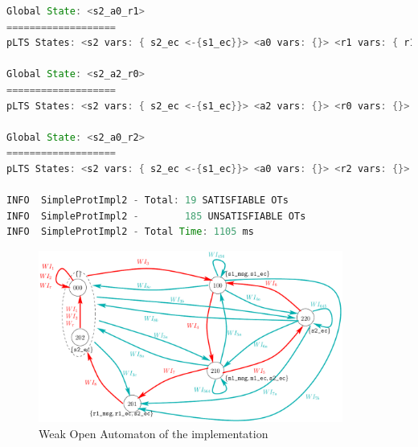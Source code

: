 \documentclass{lmcs}
\begin{document}
\begin{lstlisting}[basicstyle=\scriptsize\ttfamily, language=java, frame=single]
Global State: <s2_a0_r1>
===================
pLTS States: <s2 vars: { s2_ec <-{s1_ec}}> <a0 vars: {}> <r1 vars: { r1_ec <-{c} r1_msg <-{msg}}>

Global State: <s2_a2_r0>
===================
pLTS States: <s2 vars: { s2_ec <-{s1_ec}}> <a2 vars: {}> <r0 vars: {}>

Global State: <s2_a0_r2>
===================
pLTS States: <s2 vars: { s2_ec <-{s1_ec}}> <a0 vars: {}> <r2 vars: {}>

INFO  SimpleProtImpl2 - Total: 19 SATISFIABLE OTs
INFO  SimpleProtImpl2 -        185 UNSATISFIABLE OTs
INFO  SimpleProtImpl2 - Total Time: 1105 ms

\end{lstlisting}






\begin{figure}[h]
   \centerline{\includegraphics[width=10cm]{XFIG/SimpleProtImpl-WOA2}}
   \caption{Weak Open Automaton of the implementation}
   \label{Appendix:ImplOA2}
 \end{figure}
\end{document}
